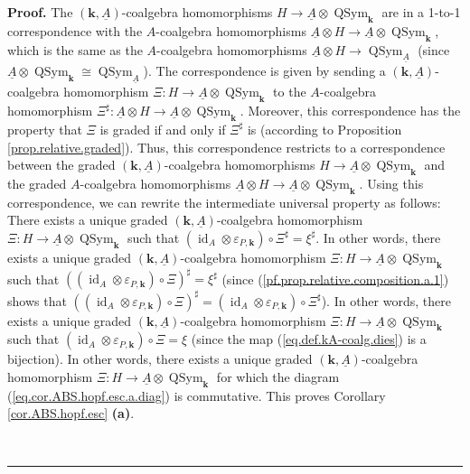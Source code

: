 \documentclass
[numbers=enddot,12pt,final,onecolumn,notitlepage,abstracton]{scrartcl}%
\theoremstyle{definition}
\newenvironment{proof}[1][Proof]{\noindent\textbf{#1.} }{\ \rule{0.5em}{0.5em}}
\begin{document}
\begin{proof}
The $\left(  \mathbf{k},\underline{A}\right)  $-coalgebra homomorphisms
$H\rightarrow\underline{A}\otimes\operatorname*{QSym}\nolimits_{\mathbf{k}}$
are in a 1-to-1 correspondence with the $A$-coalgebra homomorphisms
$\underline{A}\otimes H\rightarrow\underline{A}\otimes\operatorname*{QSym}%
\nolimits_{\mathbf{k}}$, which is the same as the $A$-coalgebra homomorphisms
$\underline{A}\otimes H\rightarrow\operatorname*{QSym}\nolimits_{\underline{A}%
}$ (since $\underline{A}\otimes\operatorname*{QSym}\nolimits_{\mathbf{k}}%
\cong\operatorname*{QSym}\nolimits_{\underline{A}}$). The correspondence is
given by sending a $\left(  \mathbf{k},\underline{A}\right)  $-coalgebra
homomorphism $\Xi:H\rightarrow\underline{A}\otimes\operatorname*{QSym}%
\nolimits_{\mathbf{k}}$ to the $A$-coalgebra homomorphism $\Xi^{\sharp
}:\underline{A}\otimes H\rightarrow\underline{A}\otimes\operatorname*{QSym}%
\nolimits_{\mathbf{k}}$. Moreover, this correspondence has the property that
$\Xi$ is graded if and only if $\Xi^{\sharp}$ is (according to Proposition
\ref{prop.relative.graded}). Thus, this correspondence restricts to a
correspondence between the graded $\left(  \mathbf{k},\underline{A}\right)
$-coalgebra homomorphisms $H\rightarrow\underline{A}\otimes
\operatorname*{QSym}\nolimits_{\mathbf{k}}$ and the graded $A$-coalgebra
homomorphisms $\underline{A}\otimes H\rightarrow\underline{A}\otimes
\operatorname*{QSym}\nolimits_{\mathbf{k}}$. Using this correspondence, we can
rewrite the intermediate universal property as follows: There exists a unique
graded $\left(  \mathbf{k},\underline{A}\right)  $-coalgebra homomorphism
$\Xi:H\rightarrow\underline{A}\otimes\operatorname*{QSym}\nolimits_{\mathbf{k}%
}$ such that $\left(  \operatorname*{id}\nolimits_{A}\otimes\varepsilon
_{P,\mathbf{k}}\right)  \circ\Xi^{\sharp}=\xi^{\sharp}$. In other words, there
exists a unique graded $\left(  \mathbf{k},\underline{A}\right)  $-coalgebra
homomorphism $\Xi:H\rightarrow\underline{A}\otimes\operatorname*{QSym}%
\nolimits_{\mathbf{k}}$ such that $\left(  \left(  \operatorname*{id}%
\nolimits_{A}\otimes\varepsilon_{P,\mathbf{k}}\right)  \circ\Xi\right)
^{\sharp}=\xi^{\sharp}$ (since (\ref{pf.prop.relative.composition.a.1}) shows
that $\left(  \left(  \operatorname*{id}\nolimits_{A}\otimes\varepsilon
_{P,\mathbf{k}}\right)  \circ\Xi\right)  ^{\sharp}=\left(  \operatorname*{id}%
\nolimits_{A}\otimes\varepsilon_{P,\mathbf{k}}\right)  \circ\Xi^{\sharp}$). In
other words, there exists a unique graded $\left(  \mathbf{k},\underline{A}%
\right)  $-coalgebra homomorphism $\Xi:H\rightarrow\underline{A}%
\otimes\operatorname*{QSym}\nolimits_{\mathbf{k}}$ such that $\left(
\operatorname*{id}\nolimits_{A}\otimes\varepsilon_{P,\mathbf{k}}\right)
\circ\Xi=\xi$ (since the map (\ref{eq.def.kA-coalg.dies}) is a bijection). In
other words, there exists a unique graded $\left(  \mathbf{k},\underline{A}%
\right)  $-coalgebra homomorphism $\Xi:H\rightarrow\underline{A}%
\otimes\operatorname*{QSym}\nolimits_{\mathbf{k}}$ for which the diagram
(\ref{eq.cor.ABS.hopf.esc.a.diag}) is commutative. This proves Corollary
\ref{cor.ABS.hopf.esc} \textbf{(a)}.


\end{proof}
\end{document}
